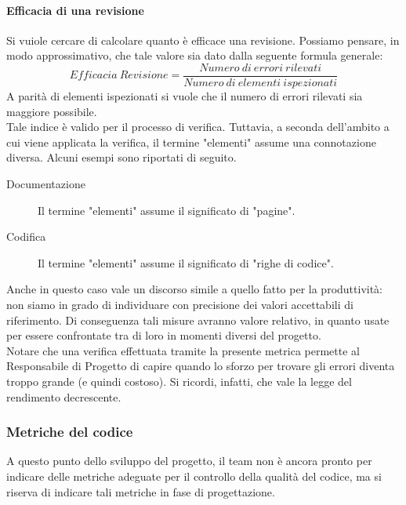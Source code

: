 				\paragraph{Efficacia di una revisione}
					Si vuiole cercare di calcolare quanto è efficace una revisione. Possiamo pensare, in modo approssimativo, che tale valore sia dato 
					dalla seguente formula generale:
					\begin{equation}
						\label{Efficacia revisione}
						Efficacia\ Revisione = \frac{Numero\ di\ errori\ rilevati}{Numero\ di\ elementi\ ispezionati}
					\end{equation}
					A parità di elementi ispezionati si vuole che il numero di errori rilevati sia maggiore possibile.\\
					Tale indice è valido per il processo di verifica. Tuttavia, a seconda dell'ambito a cui viene applicata la verifica, il termine 
					"elementi" assume una connotazione diversa. Alcuni esempi sono riportati di seguito.
					\begin{description}
						\item[Documentazione] Il termine "elementi" assume il significato di "pagine".
						\item[Codifica] Il termine "elementi" assume il significato di "righe di codice".
					\end{description}
					Anche in questo caso vale un discorso simile a quello fatto per la produttività: non siamo in grado di individuare con 
					precisione dei valori accettabili di riferimento. Di conseguenza tali misure avranno valore relativo, in quanto usate per essere 
					confrontate tra di loro in momenti diversi del progetto.\\
					Notare che una verifica effettuata tramite la presente metrica permette al Responsabile di Progetto di capire quando lo sforzo per 
					trovare gli errori diventa troppo grande (e quindi costoso). Si ricordi, infatti, che vale la legge del rendimento decrescente.
		\subsubsection{Metriche del codice}
			A questo punto dello sviluppo del progetto, il team non è ancora pronto per indicare delle metriche adeguate per il controllo della 
			qualità del codice, ma si riserva di indicare tali metriche in fase di progettazione.
